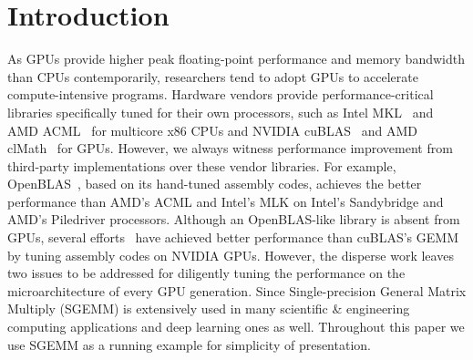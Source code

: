 
\section{Introduction}
\label{sec:intro}

As GPUs provide higher peak floating-point performance and memory bandwidth than CPUs contemporarily, researchers tend to adopt GPUs to accelerate compute-intensive programs. 
Hardware vendors provide performance-critical libraries specifically tuned for their own processors, such as Intel MKL~\cite{intel2007intel} and AMD ACML~\cite{amd2014} for multicore x86 CPUs and NVIDIA cuBLAS~\cite{intel2007intel} and AMD clMath~\cite{clmath} for GPUs. 
However, we always witness performance improvement from third-party implementations over these vendor libraries. 
For example, OpenBLAS~\cite{wang2013augem}, based on its hand-tuned assembly codes, achieves the better performance than AMD's ACML and Intel's MLK on Intel's Sandybridge and AMD's Piledriver processors. %
Although an OpenBLAS-like library is absent from GPUs, several %
efforts~\cite{tan,lai,nervana_sgemm_wiki,
chien, volkov} have achieved better performance than cuBLAS's GEMM by tuning assembly codes on NVIDIA GPUs. 
However, %
the disperse work leaves two issues to be addressed for diligently tuning the performance on the microarchitecture of every GPU generation. Since Single-precision General Matrix Multiply (SGEMM) is extensively used in many scientific \& engineering computing applications and deep learning ones as well. Throughout this paper we use SGEMM as a running example for simplicity of presentation.

